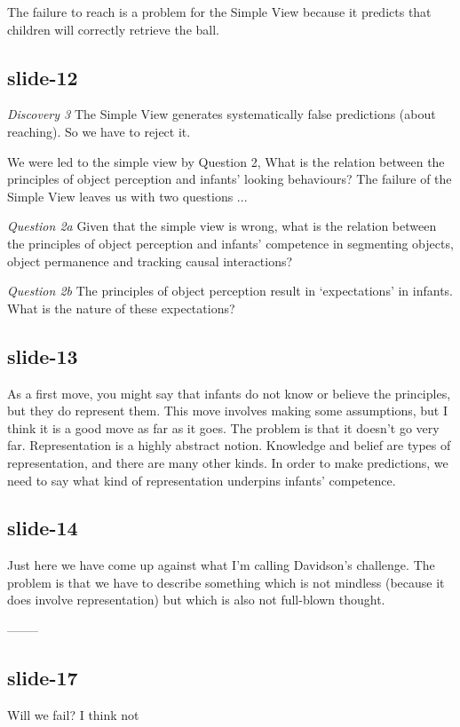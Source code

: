 \documentclass[12pt,\papersize]{extarticle}
\begin{document}
The failure to reach is a problem for the Simple View because it predicts that children will 
correctly retrieve the ball.
 
\subsection{slide-12}
\emph{Discovery 3}  The Simple View generates systematically false predictions (about reaching).
So we have to reject it.
 
We were led to the simple view by Question 2, What is the relation between the principles of 
object perception and infants' looking behaviours?
The failure of the Simple View leaves us with two questions ...
 
\emph{Question 2a} Given that the simple view is wrong, what is the relation between the principles of object perception and infants’ competence in segmenting objects, object permanence and tracking causal interactions?
 
\emph{Question 2b} The principles of object perception result in ‘expectations’ in infants.  What is the nature of these expectations?
 
\subsection{slide-13}
As a first move, you might say that infants do not know or believe the principles,
but they do represent them.  This move involves making some assumptions, but I think it is a 
good move as far as it goes.
The problem is that it doesn't go very far.
Representation is a highly abstract notion. 
Knowledge and belief are types of representation, and there are many other kinds.
In order to make predictions, we need to say what kind of representation underpins
infants' competence.
 
\subsection{slide-14}
Just here we have come up against what I'm calling Davidson's challenge.
The problem is that we have to describe something which is not mindless (because it does 
involve representation) but which is also not full-blown thought.
 
--------
\subsection{slide-17}
Will we fail?
I think not
 
\end{document}
